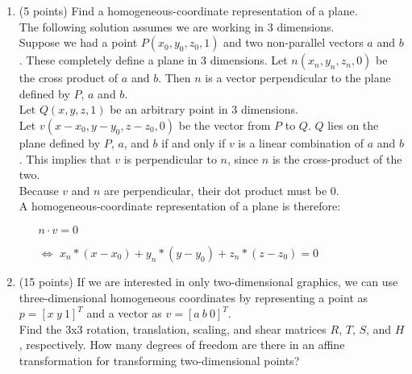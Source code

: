 \documentclass[13pt]{letter}
\begin{document}
\begin{enumerate}
	\item (5 points)
	Find a homogeneous-coordinate representation of a plane. \\
	
	The following solution assumes we are working in 3 dimensions. \\
	Suppose we had a point $P(x_0, y_0, z_0, 1)$ and two non-parallel vectors $a$ and $b$. These completely define a plane in 3 dimensions. Let $n(x_n, y_n, z_n, 0)$ be the cross product of $a$ and $b$. Then $n$ is a vector perpendicular to the plane defined by $P$, $a$ and $b$. \\
	Let $Q(x, y, z, 1)$ be an arbitrary point in 3 dimensions. \\
	Let $v(x-x_0, y-y_0, z-z_0, 0)$ be the vector from $P$ to $Q$. $Q$ lies on the plane defined by $P$, $a$, and $b$ if and only if $v$ is a linear combination of $a$ and $b$. This implies that $v$ is perpendicular to $n$, since $n$ is the cross-product of the two. \\
	Because $v$ and $n$ are perpendicular, their dot product must be 0. \\
	A homogeneous-coordinate representation of a plane is therefore:
	\begin{enumerate}
		\item[] $n \cdot v = 0$
    \item[$\Leftrightarrow$] $x_n * (x-x_0) + y_n * (y-y_0) + z_n * (z-z_0) = 0$
	\end{enumerate}
	
	\item (15 points)
	If we are interested in only two-dimensional graphics, we can use three-dimensional homogeneous coordinates by representing a point as $p = [x~y~1]^T$ and a vector as $v = [a~b~0]^T$. \\
	Find the 3x3 rotation, translation, scaling, and shear matrices $R$, $T$, $S$, and $H$, respectively. How many degrees of freedom are there in an affine transformation for transforming two-dimensional points?
	

\end{enumerate}
\end{document}
